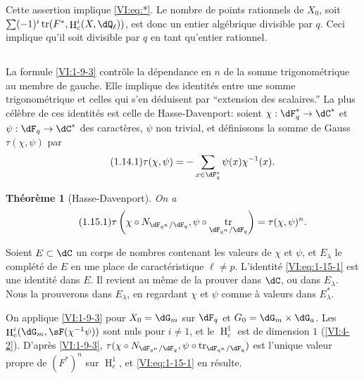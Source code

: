 \documentclass[oneside]{book}
\DeclareMathOperator{\h}{H}
\DeclareMathOperator{\tr}{tr}
\theoremstyle{sga-source}
\theoremstyle{sga-source-dash}
\theoremstyle{sga-source-dotdash}
\theoremstyle{sga-source-number-note-dash}
\theoremstyle{sga-source-note-number-dotdash}
\theoremstyle{sga-source-example-dotdash}
\theoremstyle{sga-source-inline-number}
\theoremstyle{sga-source-bare-number}
\theoremstyle{sga-source}
\newtheorem{theorem_}[subsection]{Théorème}
\newcommand{\PrintPage}[1]{}\newcommand{\MathPage}[1]{}\newcommand{\PrintCite}[2]{#1}\newcommand{\var}[3]{#2}
\begin{document}
Cette assertion implique \eqref{VI:eq:*}. Le nombre de points rationnels de 
$X_0$, soit $\var{\sum (-1)^i \tr(F^\ast,\h^i(X,\dQ_\ell))}{\sum (-1)^i \tr(F^\ast,\h_c^i(X,\dQ_\ell))}{S45-SOL-0697}$, est donc un entier 
algébrique divisible par $q$. Ceci implique qu'il soit divisible par $q$ en 
tant qu'entier rationnel. 





\PrintPage{177}
\subsection{}\label{VI:1-14}

La formule \ref{VI:1-9-3} contrôle la dépendance en $n$ de la somme 
trigonométrique au membre de gauche. Elle implique des identités entre une 
somme trigonométrique et celles qui s'en déduisent par ``extension des 
scalaires.'' La plus célèbre de ces identités est celle de 
Hasse-Davenport: soient $\chi:\dF_q^\ast \to \dC^\ast$ et 
$\psi:\dF_q\to \dC^\ast$ des caractères, $\psi$ non trivial, et 
définissons la somme de Gauss $\tau(\chi,\psi)$ par 
\begin{equation*}\tag{1.14.1}\label{VI:eq:1-14-1}
  \tau(\chi,\psi) = - \sum_{x\in \dF_q^\ast} \psi(x) \chi^{-1}(x) \text{.}
\end{equation*}





\begin{theorem_}[Hasse-Davenport]\label{VI:1-15}
On a 
\begin{equation*}\tag{1.15.1}\label{VI:eq:1-15-1}
  \tau\left(\chi\circ N_{\dF_{q^n}/\dF_q},\psi\circ \tr_{\dF_{q^n}/\dF_q}\right) = \tau(\chi,\psi)^n \text{.}
\end{equation*}
\end{theorem_}

Soient $E\subset \dC$ un corps de nombres contenant les valeurs de $\chi$ et 
$\psi$, et $E_\lambda$ le complété de $E$ en une place de caractéristique 
$\ell\ne p$. L'identité \eqref{VI:eq:1-15-1} est une identité dans $E$. Il 
revient au même de la prouver dans $\dC$, ou dans $E_\lambda$. Nous la 
prouverons dans $E_\lambda$, en regardant $\chi$ et $\psi$ comme à valeurs 
dans $E_\lambda^\ast$. 

On applique \ref{VI:1-9-3} pour $X_0=\dG_m$ sur $\dF_q$ et 
$G_0=\dG_m\times \dG_a$. Les $\h_c^i(\dG_m,\sF(\chi^{-1}\psi))$ sont nuls pour 
$i\ne 1$, et le $\h_c^1$ est de dimension $1$ (\ref{VI:4-2}). D'après 
\ref{VI:1-9-3}, 
$\tau(\chi\circ N_{\dF_{q^n}/\dF_q},\psi\circ \tr_{\dF_{q^n}/\dF_q})$ est 
l'unique valeur propre de $(F^\ast)^n$ sur $\h_c^1$, et \eqref{VI:eq:1-15-1} en 
résulte. 
\end{document}
